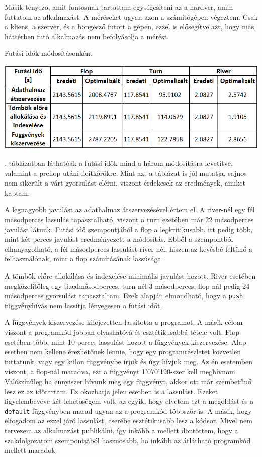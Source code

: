 Másik tényező, amit fontosnak tartottam egységesíteni az a hardver, amin futtatom az alkalmazást. A méréseket ugyan azon a számítógépen végeztem. Csak a kliens, a szerver, és a böngésző futott a gépen, ezzel is elősegítve azt, hogy más, háttérben futó alkalmazás nem befolyásolja a mérést. 

\begin{table}[h]
\centering
\caption{Futási idők módosításonként}
\label{tab:running-time}
\medskip
\includegraphics[width=\textwidth]{images/running-time.png}
\end{table}

. táblázatban láthatóak a futási idők mind a három módosításra levetítve, valamint a preflop utáni licitkörökre. Mint azt a táblázat is jól mutatja, sajnos nem sikerült a várt gyorsulást elérni, viszont érdekesek az eredmények, amiket kaptam.

A legnagyobb javulást az adathalmaz átszervezésével értem el. A river-nél egy fél másodperces lassulás tapasztalható, viszont a turn esetében már 22 másodperces javulást látunk. Futási idő szempontjából a flop a legkritikusabb, itt pedig több, mint két perces javulást eredményezett a módosítás. Ebből a szempontból elhanyagolható, a fél másodperces lassulást river-nél, hiszen az kevésbé feltűnő a felhasználónak, mint a flop számításának lassúsága.

A tömbök előre allokálása és indexelése minimális javulást hozott. River esetében megközelítőleg egy tizedmásodperces, turn-nél 3 másodperces, flop-nál pedig 24 másodperces gyorsulást tapasztaltam. Ezek alapján elmondható, hogy a \texttt{push} függvényhívás nem lassítja lényegesen a futási időt.

A függvények kiszervezése kifejezetten lassította a programot. A másik célom viszont a programkód jobban olvashatóvá és esztétikusabbá tétele volt. Flop esetében több, mint 10 perces lassulást hozott a függvények kiszervezése. Alap esetben nem kellene érezhetőnek lennie, hogy egy programrészletet közvetlen futtatunk, vagy egy külön függvénybe írjuk és úgy hívjuk meg. Az én esetemben viszont, a flop-nál maradva, ezt a függvényt 1'070'190-szer kell meghívnom. Valószínűleg ha ennyiszer hívunk meg egy függvényt, akkor ott már szembetűnő lesz ez az időtartam. Ez okozhatja jelen esetben is a lassulást. Ezeket figyelembevéve két lehetőségem volt, az egyik, hogy elvetem ezt a megoldást és a \texttt{default} függvényben marad ugyan az a programkód többször is. A másik, hogy elfogadom az ezzel járó lassulást, cserébe esztétikusabb lesz a kódsor. Mivel nem tervezem az alkalmazást publikálni, így inkább a mellett döntöttem, hogy a szakdolgozatom szempontjából hasznosabb, ha inkább az átlátható programkód mellett maradok.

